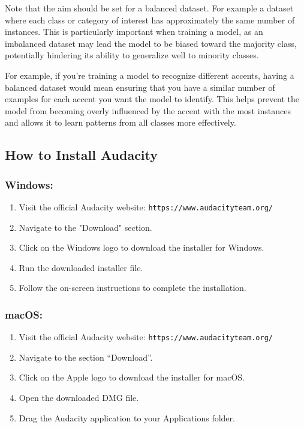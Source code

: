 Note that the aim should be set for a balanced dataset. For example a dataset where each class or category of interest has approximately the same number of instances. This is particularly important when training a model, as an imbalanced dataset may lead the model to be biased toward the majority class, potentially hindering its ability to generalize well to minority classes.

For example, if you're training a model to recognize different accents, having a balanced dataset would mean ensuring that you have a similar number of examples for each accent you want the model to identify. This helps prevent the model from becoming overly influenced by the accent with the most instances and allows it to learn patterns from all classes more effectively.


\subsection{How to Install Audacity}

\subsubsection{Windows:}

\begin{enumerate}
    \item Visit the official Audacity website: \texttt{https://www.audacityteam.org/}
    \item Navigate to the "Download" section.
    \item Click on the Windows logo to download the installer for Windows.
    \item Run the downloaded installer file.
    \item Follow the on-screen instructions to complete the installation.
\end{enumerate}

\subsubsection{macOS:}

\begin{enumerate}
    \item Visit the official Audacity website: \texttt{https://www.audacityteam.org/}
    \item Navigate to the  section ``Download''.
    \item Click on the Apple logo to download the installer for macOS.
    \item Open the downloaded DMG file.
    \item Drag the Audacity application to your Applications folder.
\end{enumerate}

